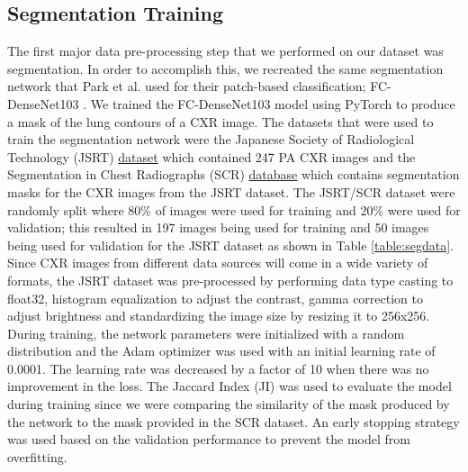 \documentclass{sigkddExp}
\begin{document}
\subsection{Segmentation Training}
The first major data pre-processing step that we performed on our dataset was
segmentation. In order to accomplish this, we recreated the same segmentation
network that Park et al. used for their patch-based classification;
FC-DenseNet103 \cite{DBLP:journals/corr/JegouDVRB16}. We trained the
FC-DenseNet103 model using PyTorch to produce a mask of the lung contours of a
CXR image. The datasets that were used to train the segmentation network were
the Japanese Society of Radiological Technology (JSRT)
\href{http://db.jsrt.or.jp/eng.php}{dataset} which contained 247 PA CXR images
and the Segmentation in Chest Radiographs (SCR)
\href{https://www.isi.uu.nl/Research/Databases/SCR/}{database} which contains
segmentation masks for the CXR images from the JSRT dataset. The JSRT/SCR
dataset were randomly split where 80\% of images were used for training and 20\%
were used for validation; this resulted in 197 images being used for training
and 50 images being used for validation for the JSRT dataset as shown in Table
\ref{table:segdata}. Since CXR images from different data sources will come in a
wide variety of formats, the JSRT dataset was pre-processed by performing data
type casting to float32, histogram equalization to adjust the contrast, gamma
correction to adjust brightness and standardizing the image size by resizing it
to 256x256. During training, the network parameters were initialized with a
random distribution and the Adam optimizer was used with an initial learning
rate of 0.0001. The learning rate was decreased by a factor of 10 when there was
no improvement in the loss. The Jaccard Index (JI) was used to evaluate the
model during training since we were comparing the similarity of the mask
produced by the network to the mask provided in the SCR dataset. An early
stopping strategy was used based on the validation performance to prevent the
model from overfitting.
\end{document}
